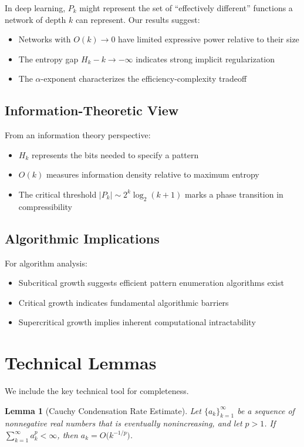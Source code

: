 \documentclass[11pt]{article}
\newtheorem{lemma}[theorem]{Lemma}
\theoremstyle{definition}
\begin{document}
In deep learning, $P_k$ might represent the set of ``effectively different'' functions a network of depth $k$ can represent. Our results suggest:
\begin{itemize}
\item Networks with $O(k)\to 0$ have limited expressive power relative to their size
\item The entropy gap $H_k-k\to-\infty$ indicates strong implicit regularization
\item The $\alpha$-exponent characterizes the efficiency-complexity tradeoff
\end{itemize}

\subsection{Information-Theoretic View}

From an information theory perspective:
\begin{itemize}
\item $H_k$ represents the bits needed to specify a pattern
\item $O(k)$ measures information density relative to maximum entropy
\item The critical threshold $|P_k|\sim 2^k\log_2(k+1)$ marks a phase transition in compressibility
\end{itemize}

\subsection{Algorithmic Implications}

For algorithm analysis:
\begin{itemize}
\item Subcritical growth suggests efficient pattern enumeration algorithms exist
\item Critical growth indicates fundamental algorithmic barriers
\item Supercritical growth implies inherent computational intractability
\end{itemize}

\section{Technical Lemmas}

We include the key technical tool for completeness.

\begin{lemma}[Cauchy Condensation Rate Estimate]\label{lem:dyadic}
Let $\{a_k\}_{k=1}^\infty$ be a sequence of nonnegative real numbers that is eventually nonincreasing, and let $p>1$. If $\sum_{k=1}^\infty a_k^{p}<\infty$, then $a_k=O\big(k^{-1/p}\big)$.
\end{lemma}
\end{document}
